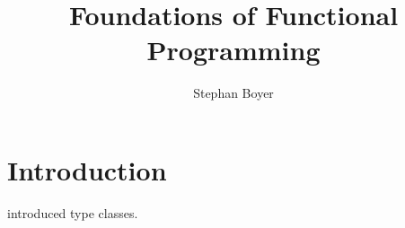 \documentclass[oneside]{book}
\title{Foundations of Functional Programming}
\author{Stephan Boyer}
\date{}
\begin{document}
  \frontmatter

  \maketitle

  \tableofcontents

  \mainmatter

  \chapter{Introduction}

    \citet{wadler89} introduced type classes.

  \backmatter

  

  \printindex
\end{document}
